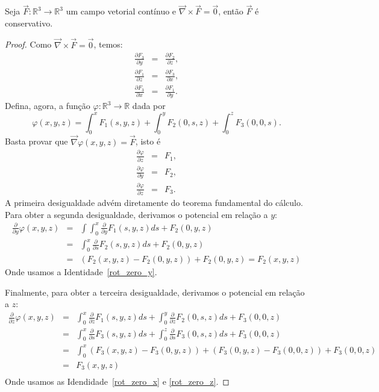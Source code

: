 \begin{teo} Seja $\vec{F}:\mathbb{R}^3\to\mathbb{R}^3$ um campo vetorial contínuo e $\vec{\nabla}\times \vec{F}=\vec{0}$, então $\vec{F}$ é conservativo.
 \end{teo}
\begin{proof} Como $\vec{\nabla}\times \vec{F}=\vec{0}$, temos:
\begin{eqnarray}
 \frac{\partial F_3}{\partial y} &=&\frac{\partial F_2}{\partial z}\label{rot_zero_x},\\
 \frac{\partial F_1}{\partial z} &=&\frac{\partial F_3}{\partial x}\label{rot_zero_y},\\
 \frac{\partial F_3}{\partial x} &=&\frac{\partial F_1}{\partial y}\label{rot_zero_z}.
\end{eqnarray}
Defina, agora, a função $\varphi:\mathbb{R}^3\to\mathbb{R}$ dada por
$$\varphi(x,y,z)=\int_0^xF_1(s,y,z) + \int_0^yF_2(0,s,z)+\int_0^zF_3(0,0,s).$$
Basta provar que $\vec{\nabla}\varphi(x,y,z)=\vec{F}$, isto é
\begin{eqnarray}
 \frac{\partial \varphi}{\partial z} &=&F_1,\label{rot_zero_der_x}\\
 \frac{\partial \varphi}{\partial y} &=&F_2,\label{rot_zero_der_y}\\
 \frac{\partial \varphi}{\partial z} &=&F_3\label{rot_zero_der_z}.
\end{eqnarray}
A primeira desigualdade advém diretamente do teorema fundamental do cálculo. Para obter a segunda desigualdade, derivamos o potencial em relação a $y$:
\begin{eqnarray*}
\frac{\partial }{\partial y}\varphi(x,y,z)&=&\int\int_0^x \frac{\partial }{\partial y}F_1(s,y,z)ds+ F_2(0,y,z)\\
&=&\int_0^x \frac{\partial }{\partial s}F_2(s,y,z)ds+ F_2(0,y,z)\\
&=&\left(F_2(x,y,z)-F_2(0,y,z)\right)+ F_2(0,y,z) = F_2(x,y,z)
\end{eqnarray*}
Onde usamos a Identidade~\ref{rot_zero_y}.

Finalmente, para obter a terceira desigualdade, derivamos o potencial em relação a $z$:
\begin{eqnarray*}
\frac{\partial }{\partial z}\varphi(x,y,z)&=&\int_0^x \frac{\partial }{\partial z}F_1(s,y,z)ds + \int_0^y \frac{\partial }{\partial z}F_2(0,s,z)ds+F_3(0,0,z)\\
&=&\int_0^x \frac{\partial }{\partial s}F_3(s,y,z)ds + \int_0^z \frac{\partial }{\partial s}F_3(0,s,z)ds+F_3(0,0,z)\\
&=&\int_0^x \left(F_3(x,y,z)-F_3(0,y,z)\right) + \left(F_3(0,y,z)-F_3(0,0,z)\right)+F_3(0,0,z)\\
&=&F_3(x,y,z)\\
\end{eqnarray*}
  Onde usamos as Idendidade~\ref{rot_zero_x} e \ref{rot_zero_z}.
\end{proof}




